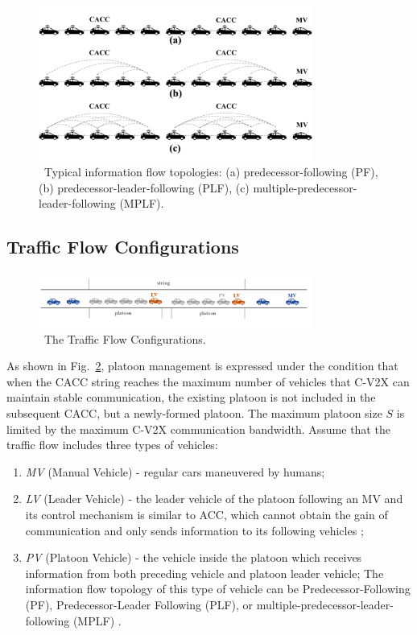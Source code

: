 \documentclass[journal]{IEEEtran}
\begin{document}
\begin{figure}
  \centering
  \includegraphics[width=9cm]{fig1.png}
  \caption{~Typical information flow topologies: (a) predecessor-following (PF), (b) predecessor-leader-following (PLF), (c) multiple-predecessor-leader-following (MPLF).}
  \label{Figure1}
\end{figure}


\subsection{Traffic Flow Configurations}

\begin{figure}
  \centering
  \includegraphics[width=9cm]{fig2.png}
  \caption{~The Traffic Flow Configurations.}
  \label{Figure2}
\end{figure}

As shown in Fig.~\ref{Figure2}, platoon management is expressed under the condition that when the CACC string reaches the maximum number of vehicles that C-V2X can maintain stable communication, the existing platoon is not included in the subsequent CACC, but a newly-formed platoon. The maximum platoon size $S$ is limited by the maximum C-V2X communication bandwidth. Assume that the traffic flow includes three types of vehicles:


\begin{enumerate}
  \item \emph{MV} (Manual Vehicle) - regular cars maneuvered by humans;
  \item \emph{LV} (Leader Vehicle) - the leader vehicle of the platoon following an MV and its control mechanism is similar to ACC, which cannot obtain the gain of communication and only sends information to its following vehicles \citep{zheng2014influence};
  \item \emph{PV} (Platoon Vehicle) - the vehicle inside the platoon which receives information from both preceding vehicle and platoon leader vehicle; The information flow topology of this type of vehicle can be Predecessor-Following (PF), Predecessor-Leader Following (PLF), or multiple-predecessor-leader-following (MPLF) \citep{zheng2014influence}.
\end{enumerate}
\end{document}
